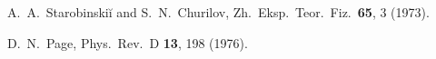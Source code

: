 \documentclass[12pt]{article}
\begin{document}
\begin{thebibliography}{99}
A.~A.~Starobinski\u{i} and S.~N.~Churilov,
Zh.\ Eksp.\ Teor.\ Fiz.\ {\bf 65}, 3 (1973).

D.~N.~Page,
Phys.\ Rev.\ D {\bf 13}, 198 (1976).

\end{thebibliography}
\end{document}
